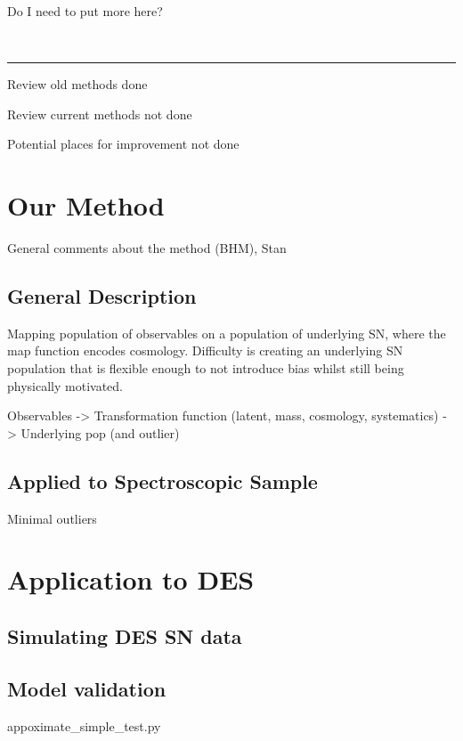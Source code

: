 \documentclass[a4paper,fleqn,usenatbib]{mnras}
\newcommand{\green}{\color{green}}
\newcommand{\red}{\color{red}}
\begin{document}
{\red Do I need to put more here?}

\

\rule{\linewidth}{1pt}
Review old methods {\green done}

Review current methods {\red not done}

Potential places for improvement {\red not done}









\section{Our Method}
\label{sec:method}

General comments about the method (BHM), Stan

\subsection{General Description}

Mapping population of observables on a population of underlying SN, where the map function encodes
cosmology. Difficulty is creating an underlying SN population that is flexible enough to not introduce bias whilst still being physically motivated. 


Observables -> Transformation function (latent, mass, cosmology, systematics) -> Underlying pop (and outlier)

\subsection{Applied to Spectroscopic Sample}

Minimal outliers

\section{Application to DES}
\label{sec:des}

\subsection{Simulating DES SN data}

\subsection{Model validation}

appoximate\_simple\_test.py
\end{document}
